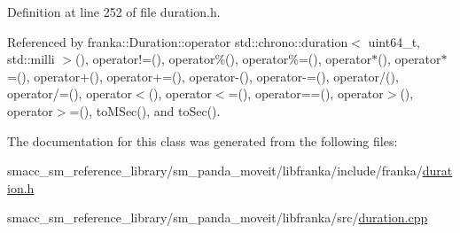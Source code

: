 Definition at line 252 of file duration.\+h.



Referenced by franka\+::\+Duration\+::operator std\+::chrono\+::duration$<$ uint64\+\_\+t, std\+::milli $>$(), operator!=(), operator\%(), operator\%=(), operator$\ast$(), operator$\ast$=(), operator+(), operator+=(), operator-\/(), operator-\/=(), operator/(), operator/=(), operator$<$(), operator$<$=(), operator==(), operator$>$(), operator$>$=(), to\+M\+Sec(), and to\+Sec().



The documentation for this class was generated from the following files\+:\begin{DoxyCompactItemize}
\item 
smacc\+\_\+sm\+\_\+reference\+\_\+library/sm\+\_\+panda\+\_\+moveit/libfranka/include/franka/\hyperlink{duration_8h}{duration.\+h}\item 
smacc\+\_\+sm\+\_\+reference\+\_\+library/sm\+\_\+panda\+\_\+moveit/libfranka/src/\hyperlink{duration_8cpp}{duration.\+cpp}\end{DoxyCompactItemize}

